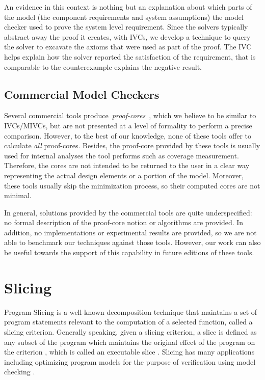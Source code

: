 An evidence in this context is nothing but an
explanation about which parts of the model (the component requirements and system assumptions) the
model checker used to prove the system level requirement. Since the solvers typically abstract away the proof it creates, with IVCs, we develop a technique to query the solver to excavate the axioms that were used as part of the proof. The IVC helps explain how the solver reported the satisfaction of the requirement, that is comparable to the counterexample explains the negative result.



\subsection{Commercial Model Checkers}
Several commercial tools produce~\emph{proof-cores}~\cite{hanna2015formal, jasper_gold}, which we believe to be similar to IVCs/MIVCs, but are not presented at a level of formality to perform a precise comparison.  However, to the best of our knowledge, none of these tools offer to calculate \emph{all} proof-cores. Besides, the proof-core provided by these tools is usually used for internal analyses the tool performs such as coverage measurement. Therefore, the cores are not intended to be returned to the user in a clear way representing the actual design elements or a portion of the model. Moreover, these tools usually skip the minimization process, so their computed cores are not minimal.

In general, solutions provided by the commercial tools are quite underspecified:
no formal description of the proof-core notion or algorithms are provided. In addition, no implementations or experimental results are provided, so we are not able to benchmark our techniques against those tools. However, our work can also be useful towards the support of this capability in future editions of these tools.

\section{Slicing}

Program  Slicing  is  a  well-known  decomposition  technique  that  maintains a
set of program statements  relevant to  the computation  of a  selected  function, called a slicing criterion. Generally speaking, given a slicing criterion, a slice is defined
 as any subset of the program which maintains the original effect of the program on the criterion \cite{Weiser97}, which is called an executable slice \cite{Androutsopoulos}.
  Slicing has many applications including optimizing program models
   for the purpose of verification using model checking \cite{Androutsopoulos, Jhala:2005, Dwyer:2006}.

